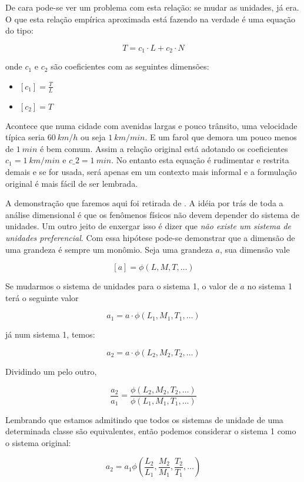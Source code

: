 De cara pode-se ver um problema com esta relação: se mudar as unidades, já era. O que esta relação empírica aproximada está fazendo na verdade é uma equação do tipo:

\[
T = c_1 \cdot L + c_2 \cdot N
\]

onde $c_1$ e $c_2$ são coeficientes com as seguintes dimensões:

\begin{itemize}
\item $[c_1] = \frac{T}{L}$
\item $[c_2] = T$
\end{itemize}

Acontece que numa cidade com avenidas largas e pouco trânsito, uma velocidade típica seria $60\:km/h$ ou seja $1\:km/min$. E um farol que demora um pouco menos de $1\:min$ é bem comum. Assim a relação original está adotando os coeficientes $c_1 = 1 \:km/min$ e $c\_2 = 1\: min$. No entanto esta equação é rudimentar e restrita demais e se for usada, será apenas em um contexto mais informal e a formulação original é mais fácil de ser lembrada.

A demonstração que faremos aqui foi retirada de \cite{Barenblatt96}. A idéia por trás de toda a análise dimensional é que os fenômenos físicos não devem depender do sistema de unidades. Um outro jeito de enxergar isso é dizer que \emph{não existe um sistema de unidades preferencial}. Com essa hipótese pode-se demonstrar que a dimensão de uma grandeza é sempre um monômio. Seja uma grandeza $a$, sua dimensão vale

\[
[a] = \phi\left( L, M, T, \ldots\right)
\]

Se mudarmos o sistema de unidades para o sistema 1, o valor de $a$ no sistema 1 terá o seguinte valor

\[
a_1 = a\cdot\phi\left(L_1, M_1, T_1, \ldots\right)
\]

já num sistema 1, temos:

\[
a_2 = a\cdot\phi\left(L_2, M_2, T_2, \ldots\right)
\]

Dividindo um pelo outro,

\[
\frac{a_2}{a_1} = \frac{ \phi\left(L_2, M_2, T_2, \ldots\right) }{ \phi\left(L_1, M_1, T_1, \ldots\right) }
\]

Lembrando que estamos admitindo que todos os sistemas de unidade de uma determinada classe são equivalentes, então podemos considerar o sistema 1 como o sistema original:

\[
a_2 = a_1\phi\left(\frac{L_2}{L_1}, \frac{M_2}{M_1}, \frac{T_2}{T_1}, \ldots \right)
\]

